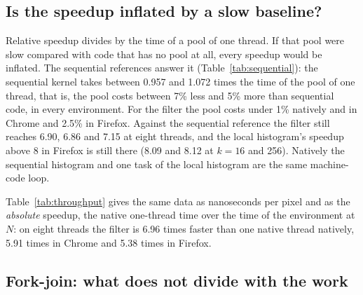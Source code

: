 \subsection{Is the speedup inflated by a slow baseline?}
\label{sec:sequential}

Relative speedup divides by the time of a pool of one thread. If that pool
were slow compared with code that has no pool at all, every speedup would
be inflated. The sequential references answer it
(Table~\ref{tab:sequential}): the sequential kernel takes between 0.957 and
1.072 times the time of the pool of one thread, that is, the pool costs
between 7\% less and 5\% more than sequential code, in every environment.
For the filter the pool costs under 1\% natively and in Chrome and 2.5\%
in Firefox. Against the sequential reference the filter still reaches 6.90,
6.86 and 7.15 at eight threads, and the local histogram's speedup above 8
in Firefox is still there (8.09 and 8.12 at $k=16$ and 256). Natively the
sequential histogram and one task of the local histogram are the same
machine-code loop.



Table~\ref{tab:throughput} gives the same data as nanoseconds per pixel and
as the \emph{absolute} speedup, the native one-thread time over the time of
the environment at $N$: on eight threads the filter is 6.96 times faster
than one native thread natively, 5.91 times in Chrome and 5.38 times in
Firefox.

\subsection{Fork-join: what does not divide with the work}
\label{sec:forkjoin}

